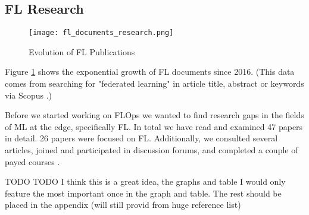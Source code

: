%
%
%
\subsection{FL Research}\label{subsection:fl_research}

\begin{figure}[h]
    \centering
    \texttt{[image: fl\_documents\_research.png]}
    \caption{Evolution of FL Publications}
    \label{fig:fl_documents_research}
\end{figure}

Figure \ref{fig:fl_documents_research} shows the exponential growth of FL documents
since 2016. (This data comes from searching for "federated learning" in article title, abstract or keywords via Scopus \cite{scopus_homepage}.)

Before we started working on FLOps we wanted to find research gaps in the fields of 
ML at the edge, specifically FL.
In total we have read and examined 47 papers in detail. 
26 papers were focused on FL. 
Additionally, we consulted several articles,
joined and participated in discussion forums,
and completed a couple of payed courses \cite{udemy_homepage}.

TODO TODO 
I think this is a great idea, the graphs and table
I would only feature the most important once in the graph and table.
The rest should be placed in the appendix (will still provid from huge reference list)

